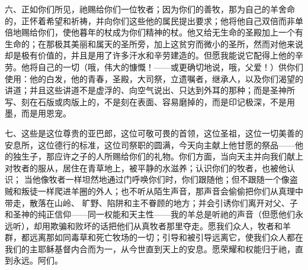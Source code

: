 六、正如你们所见，祂赐给你们一位牧者；因为你们的善牧，那为自己的羊舍命的，正怀着希望和祈祷，并向你们这些他的属民提出要求；他将他自己双倍而非单倍地赐给你们，使他暮年的杖成为你们精神的杖。他又给无生命的圣殿加上一个有生命的；在那极其美丽和属天的圣所旁，加上这贫穷而微小的圣所，然而对他来说却是极有价值的，并且是用了许多汗水和辛劳建造的。但愿我能说它配得上他的辛劳。他将自己的一切（哦，伟大的慷慨！——或更确切地说，哦，父爱！）供你们使用：他的白发，他的青春，圣殿，大司祭，立遗嘱者，继承人，以及你们渴望的讲道；并且这些讲道不是虚浮的、向空气说出、只达到外耳的那种；而是圣神所写、刻在石版或肉版上的，不是刻在表面、容易磨掉的，而是印记极深，不是用墨，而是用恩宠。\par

七、这些是这位尊贵的亚巴郎，这位可敬可畏的首领，这位圣祖，这位一切美善的安息所，这位德行的标准，这位司祭职的圆满，今天向主献上他甘愿的祭品——他的独生子，那应许之子的人所赐给你们的礼物。你们方面，当向天主并向我们献上对牧者的服从，居住在青草地上，被平静的水滋养；认识你们的牧者，也被他认识； 当他像牧者一样坦然地通过门呼唤你们时，你们跟随他；但不跟随一个像盗贼和叛徒一样爬进羊圈的外人；也不听从陌生声音，那声音会偷偷把你们从真理中带走，散落在山岭、 旷野、陷阱和主不眷顾的地方；并会引诱你们离开对父、子和圣神的纯正信仰——同一权能和天主性——我的羊总是听祂的声音（但愿他们永远听），却用欺骗和败坏的话把他们从真牧者那里夺走。愿我们众人，牧者和羊群，都远离那如同毒草和死亡牧场的一切；引导和被引导远离它，使我们众人都在我们的主耶稣基督内合而为一，从今世直到天上的安息。愿荣耀和权能归于祂，直到永远。阿们。\par



\section{}

\par

